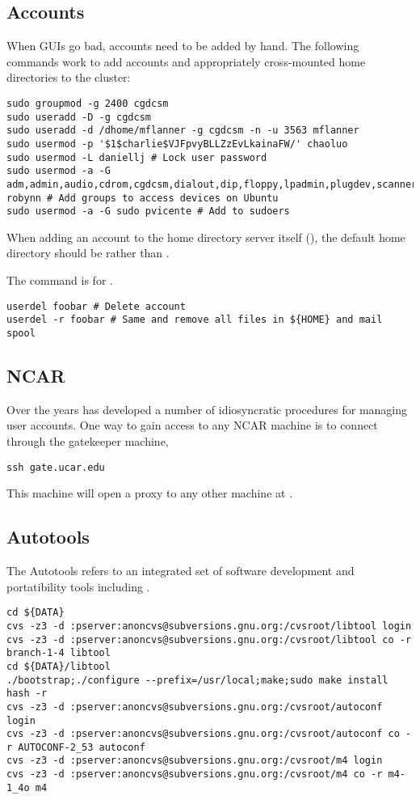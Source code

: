 \documentclass[12pt,twoside]{article}
\begin{document}
\subsection{Accounts}\label{sxn:act}
When GUIs go bad, accounts need to be added by hand.
The following commands work to add accounts and appropriately 
cross-mounted home directories to the cluster:
\begin{verbatim}
sudo groupmod -g 2400 cgdcsm
sudo useradd -D -g cgdcsm
sudo useradd -d /dhome/mflanner -g cgdcsm -n -u 3563 mflanner
sudo usermod -p '$1$charlie$VJFpvyBLLZzEvLkainaFW/' chaoluo
sudo usermod -L daniellj # Lock user password
sudo usermod -a -G adm,admin,audio,cdrom,cgdcsm,dialout,dip,floppy,lpadmin,plugdev,scanner,video robynn # Add groups to access devices on Ubuntu
sudo usermod -a -G sudo pvicente # Add to sudoers
\end{verbatim}
When adding an account to the home directory server itself
(), the default home directory should be
 rather than .

The  command is for .
\begin{verbatim}
userdel foobar # Delete account
userdel -r foobar # Same and remove all files in ${HOME} and mail spool
\end{verbatim}

\subsection{NCAR}\label{sxn:ncar}
Over the years  has developed a number of idiosyncratic
procedures for managing user accounts.
One way to gain access to any NCAR machine is to connect
through the gatekeeper machine, 
\begin{verbatim}
ssh gate.ucar.edu
\end{verbatim}
This machine will open a proxy to any other machine at .

\subsection{Autotools}\label{sxn:auto}
The  Autotools refers to an integrated set of software
development and portatibility tools including .
\begin{verbatim}
cd ${DATA}
cvs -z3 -d :pserver:anoncvs@subversions.gnu.org:/cvsroot/libtool login
cvs -z3 -d :pserver:anoncvs@subversions.gnu.org:/cvsroot/libtool co -r branch-1-4 libtool
cd ${DATA}/libtool
./bootstrap;./configure --prefix=/usr/local;make;sudo make install
hash -r
cvs -z3 -d :pserver:anoncvs@subversions.gnu.org:/cvsroot/autoconf login
cvs -z3 -d :pserver:anoncvs@subversions.gnu.org:/cvsroot/autoconf co -r AUTOCONF-2_53 autoconf
cvs -z3 -d :pserver:anoncvs@subversions.gnu.org:/cvsroot/m4 login
cvs -z3 -d :pserver:anoncvs@subversions.gnu.org:/cvsroot/m4 co -r m4-1_4o m4
\end{verbatim}
\end{document}
